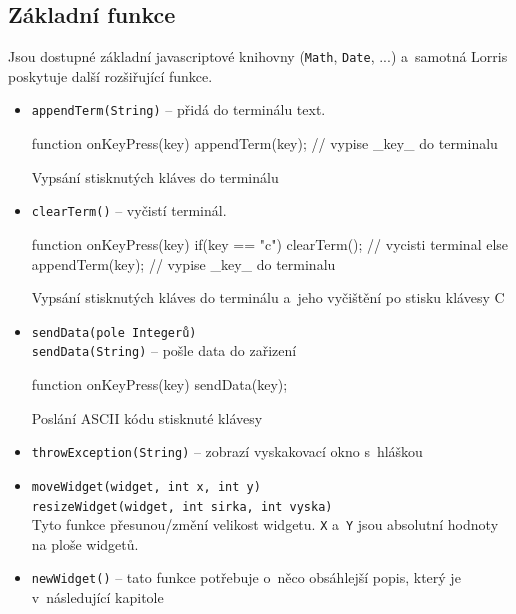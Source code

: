 \documentclass[12pt, a4paper, oneside]{article}
\begin{document}
\subsection*{Základní funkce}
Jsou dostupné základní javascriptové knihovny (\verb/Math/, \verb/Date/, ...) a~samotná Lorris poskytuje další rozšiřující funkce. 

\begin{itemize}
    \item {\color{blue}\verb/appendTerm(String)/} -- přidá do terminálu text.\\
        \begin{listing}[H]
        \begin{jscode}
function onKeyPress(key) {
    appendTerm(key); // vypise _key_ do terminalu
}
        \end{jscode}
        \caption{Vypsání stisknutých kláves do terminálu}
        \end{listing}

    \item {\color{blue}\verb/clearTerm()/} -- vyčistí terminál.\\
        \begin{listing}[H]
        \begin{jscode}
function onKeyPress(key) {
    if(key == "c")
        clearTerm(); // vycisti terminal
    else
        appendTerm(key); // vypise _key_ do terminalu
}
        \end{jscode}
        \caption{Vypsání stisknutých kláves do terminálu a~jeho vyčištění po stisku klávesy C}
        \end{listing}

    \item {\color{blue}\verb/sendData(pole Integerů)/} \\
         {\color{blue}\verb/sendData(String)/} -- pošle data do zařizení\\
        \begin{listing}[H]
        \begin{jscode}
function onKeyPress(key) {
    sendData(key);
}
        \end{jscode}
        \caption{Poslání ASCII kódu stisknuté klávesy}
        \end{listing}

    \item {\color{blue}\verb/throwException(String)/} -- zobrazí vyskakovací okno s~hláškou

    \item {\color{blue}\verb/moveWidget(widget, int x, int y)/} \\
    {\color{blue}\verb/resizeWidget(widget, int sirka, int vyska)/} \\
        Tyto funkce přesunou/změní velikost widgetu. \verb|X| a~\verb|Y| jsou absolutní hodnoty na ploše widgetů.

    \item {\color{blue}\verb/newWidget()/} -- tato funkce potřebuje o~něco obsáhlejší popis, který je v~následující kapitole
\end{itemize}
\end{document}
